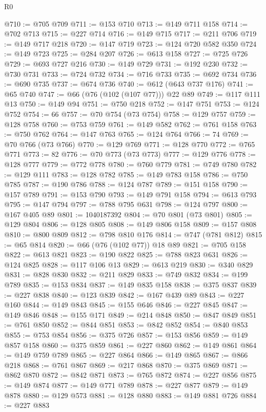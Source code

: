 \begin{lexlean}{R0}
\begin{coremodule}
@710 := @705 @709
@711 := @153 @710
@713 := @149 @711 @158
@714 := @702 @713
@715 := @227 @714
@716 := @149 @715
@717 := @211 @706
@719 := @149 @717 @218
@720 := @147 @719
@723 := @124 @720 @582 @350
@724 := @149 @723
@725 := @284 @207
@726 := @613 @158
@727 := @725 @726
@729 := @693 @727 @216
@730 := @149 @729
@731 := @192 @230
@732 := @730 @731
@733 := @724 @732
@734 := @716 @733
@735 := @692 @734
@736 := @690 @735
@737 := @674 @736
@740 := @612 (@643 @737 @176)
@741 := @65 @740
@747 := @66 (@76 (@102 (@107 @77))) @22 @89
@749 := @117 @111 @13
@750 := @149 @94
@751 := @750 @218
@752 := @147 @751
@753 := @124 @752
@754 := 66
@757 := @70 @754 (@73 @754)
@758 := @129 @757
@759 := @128 @758
@760 := @753 @759
@761 := @149 @582
@762 := @761 @158
@763 := @750 @762
@764 := @147 @763
@765 := @124 @764
@766 := 74
@769 := @70 @766 (@73 @766)
@770 := @129 @769
@771 := @128 @770
@772 := @765 @771
@773 := 82
@776 := @70 @773 (@73 @773)
@777 := @129 @776
@778 := @128 @777
@779 := @772 @778
@780 := @760 @779
@781 := @749 @780
@782 := @129 @111
@783 := @128 @782
@785 := @149 @783 @158
@786 := @750 @785
@787 := @190 @786
@788 := @124 @787
@789 := @151 @158
@790 := @157 @789
@791 := @153 @790
@793 := @149 @791 @158
@794 := @613 @793
@795 := @147 @794
@797 := @788 @795 @631
@798 := @124 @797
@800 := @167 @405 @89
@801 := 1040187392
@804 := @70 @801 (@73 @801)
@805 := @129 @804
@806 := @128 @805
@808 := @149 @806 @158
@809 := @157 @808
@810 := @800 @809
@812 := @798 @810 @176
@814 := @747 (@781 @812)
@815 := @65 @814
@820 := @66 (@76 (@102 @77)) @18 @89
@821 := @705 @158
@822 := @613 @821
@823 := @190 @822
@825 := @788 @823 @631
@826 := @124 @825
@828 := @117 @106 @13
@829 := @613 @219
@830 := @340 @829
@831 := @828 @830
@832 := @211 @829
@833 := @749 @832
@834 := @199 @789
@835 := @153 @834
@837 := @149 @835 @158
@838 := @375 @837
@839 := @227 @838
@840 := @123 @839
@842 := @167 @439 @89
@843 := @227 @160
@844 := @149 @843
@845 := @155 @646
@846 := @227 @845
@847 := @149 @846
@848 := @155 @171
@849 := @214 @848
@850 := @847 @849
@851 := @761 @850
@852 := @844 @851
@853 := @842 @852
@854 := @840 @853
@855 := @753 @854
@856 := @375 @726
@857 := @153 @856
@859 := @149 @857 @158
@860 := @375 @859
@861 := @227 @860
@862 := @149 @861
@864 := @149 @759 @789
@865 := @227 @864
@866 := @149 @865
@867 := @866 @218
@868 := @761 @867
@869 := @217 @868
@870 := @375 @869
@871 := @862 @870
@872 := @842 @871
@873 := @765 @872
@874 := @227 @856
@875 := @149 @874
@877 := @149 @771 @789
@878 := @227 @877
@879 := @149 @878
@880 := @129 @573
@881 := @128 @880
@883 := @149 @881 @726
@884 := @227 @883

\end{coremodule}
\end{lexlean}

